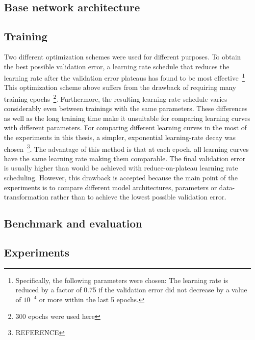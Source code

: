 


\subsection{Base network architecture}



\subsection{Training}
\label{sec:training}

Two different optimization schemes were used for different purposes.
To obtain the best possible validation error, a learning rate schedule that reduces the learning rate after the validation error plateaus has found to be most effective~\footnote{Specifically, the following parameters were chosen: The learning rate is reduced by a factor of 0.75 if the validation error did not decrease by a value of $10^{-4}$ or more within the last 5 epochs.} This optimization scheme above suffers from the drawback of requiring many training epochs~\footnote{300 epochs were used here}. Furthermore, the resulting learning-rate schedule varies considerably even between trainings with the same parameters. These differences as well as the long training time make it unsuitable for comparing learning curves with different parameters.
For comparing different learning curves in the most of the experiments in this thesis, a simpler, exponential learning-rate decay was chosen~\footnote{REFERENCE}. The advantage of this method is that at each epoch, all learning curves have the same learning rate making them comparable. The final validation error is usually higher than would be achieved with reduce-on-plateau learning rate scheduling. However, this drawback is accepted because the main point of the experiments is to compare different model architectures, parameters or data-transformation rather than to achieve the lowest possible validation error.



\subsection{Benchmark and evaluation}


\subsection{Experiments}

